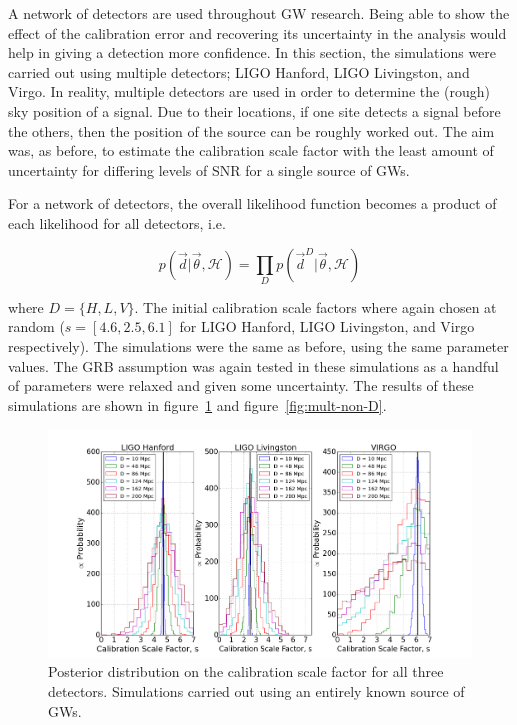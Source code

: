 \documentclass[12pt]{iopart}
\newcommand{\curlH}{\mathcal{H}}
\begin{document}
A network of detectors are used throughout GW research. Being able to show the
effect of the calibration error and recovering its uncertainty in the analysis
would help in giving a detection more confidence. In this section, the
simulations were carried out using multiple detectors; LIGO Hanford, LIGO
Livingston, and Virgo. In reality, multiple detectors are used in order to
determine the (rough) sky position of a signal. Due to their locations, if one
site detects a signal before the others, then the position of the source can be
roughly worked out. The aim was, as before, to estimate the calibration scale
factor with the least amount of uncertainty for differing levels of SNR for a
single source of GWs.

For a network of detectors, the overall likelihood function becomes a product
of each likelihood for all detectors, i.e.

\begin{equation}
  \label{eq:mult-likeli}
  p(\vec{d}| \vec{\theta}, \curlH) = \prod \limits_D p(\vec{d}^D| \vec{\theta},
\curlH)
\end{equation}

where $D = \{H,L,V\}$. The initial calibration scale factors where again chosen
at random ($s = [4.6, 2.5, 6.1]$ for LIGO Hanford, LIGO Livingston, and Virgo
respectively). The simulations were the same as before, using the same
parameter values. The GRB assumption was again tested in these simulations as a
handful of parameters were relaxed and given some uncertainty. The results of
these simulations are shown in figure~\ref{fig:mult-empty-D} and
figure~\ref{fig:mult-non-D}.

\begin{figure}
  \centering
  \includegraphics[width = \textwidth]{MD_empty_D10_200}
  \caption{Posterior distribution on the calibration scale factor for
all three detectors. Simulations carried out using an entirely known source of
GWs.}
    \label{fig:mult-empty-D}
\end{figure}
\end{document}

